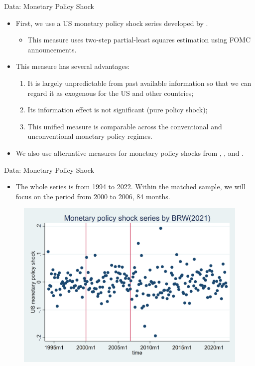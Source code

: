\documentclass[10pt]{beamer}
\begin{document}
\begin{frame}{Data: Monetary Policy Shock}
    \begin{itemize}
        \item First, we use a US monetary policy shock series developed by \cite{bu2021unified}.
        \begin{itemize}
            \item This measure uses \cite{fama1973risk} two-step partial-least squares estimation using FOMC announcements.
        \end{itemize}
        \item This measure has several advantages:
        \begin{enumerate}
            \item It is largely unpredictable from past available information so that we can regard it as exogenous for the US and other countries;
            \item Its information effect is not significant (pure policy shock);
            \item This unified measure is comparable across the conventional and unconventional monetary policy regimes.
        \end{enumerate}
        \item We also use alternative measures for monetary policy shocks from \cite{nakamura2018high}, \cite{guraynak2005actions}, and \cite{jarocinski2020deconstructing}.
    \end{itemize}
\end{frame}

\begin{frame}{Data: Monetary Policy Shock}
    \begin{itemize}
        \item The whole series is from 1994 to 2022. Within the matched sample, we will focus on the period from 2000 to 2006, 84 months.
    \end{itemize}
    \begin{figure}[htbp]
	\centering
	\includegraphics[width=0.8\columnwidth]{latex/drafts/pic/BRW.png}
	\label{sum.brw}
    \end{figure}
\end{frame}
\end{document}
